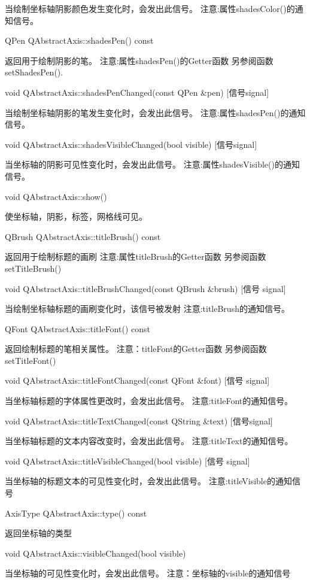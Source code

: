 当绘制坐标轴阴影颜色发生变化时，会发出此信号。 注意:属性shadesColor()的通知信号。

QPen QAbstractAxis::shadesPen() const 

返回用于绘制阴影的笔。 注意:属性shadesPen()的Getter函数 另参阅函数setShadesPen().

void QAbstractAxis::shadesPenChanged(const QPen \&pen) [信号signal] 

当绘制坐标轴阴影的笔发生变化时，会发出此信号。 注意:属性shadesPen()的通知信号。

void QAbstractAxis::shadesVisibleChanged(bool visible) [信号signal] 

当坐标轴的阴影可见性变化时，会发出此信号。 注意:属性shadesVisible()的通知信号。

void QAbstractAxis::show() 

使坐标轴，阴影，标签，网格线可见。

QBrush QAbstractAxis::titleBrush() const 

返回用于绘制标题的画刷 注意:属性titleBrush的Getter函数 另参阅函数setTitleBrush()

void QAbstractAxis::titleBrushChanged(const QBrush \&brush) [信号
signal] 

当绘制坐标轴标题的画刷变化时，该信号被发射 注意:titleBrush的通知信号。

QFont QAbstractAxis::titleFont() const 

返回绘制标题的笔相关属性。 注意：titleFont的Getter函数 另参阅函数setTitleFont()

void QAbstractAxis::titleFontChanged(const QFont \&font) [信号 signal]

当坐标轴标题的字体属性更改时，会发出此信号。 注意:titleFont的通知信号。

void QAbstractAxis::titleTextChanged(const QString \&text) [信号signal] 

当坐标轴标题的文本内容改变时，会发出此信号。 注意:titleText的通知信号。

void QAbstractAxis::titleVisibleChanged(bool visible) [信号 signal] 

当坐标轴的标题文本的可见性变化时，会发出此信号。 注意:titleVisible的通知信号

AxisType QAbstractAxis::type() const 

返回坐标轴的类型

void QAbstractAxis::visibleChanged(bool visible) 

当坐标轴的可见性变化时，会发出此信号。 注意：坐标轴的visible的通知信号

